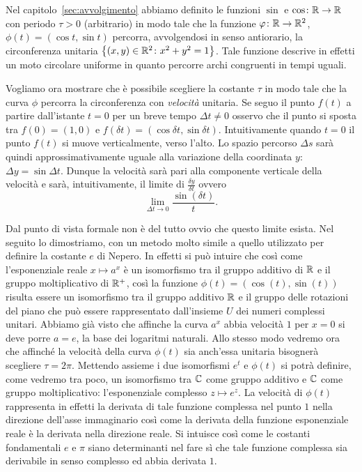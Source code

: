 Nel capitolo~\ref{sec:avvolgimento} abbiamo definito le 
funzioni $\sin$ e $\cos\colon {\mathbb R}\to {\mathbb R}$ con periodo $\tau>0$ (arbitrario)
in modo tale che la funzione $\varphi\colon {\mathbb R}\to{\mathbb R}^2$, $\phi(t)=(\cos t, \sin t)$ 
percorra, avvolgendosi in senso antiorario, la circonferenza 
unitaria ${\left\{ (x,y)\in {\mathbb R}^2\colon x^2+y^2=1 \right\}}$.
Tale funzione descrive in effetti un moto circolare uniforme 
in quanto percorre archi congruenti in tempi uguali.

Vogliamo ora mostrare che è possibile scegliere la costante $\tau$
in modo tale che la curva $\phi$ percorra la circonferenza 
con \emph{velocità} unitaria.
Se seguo il punto $f(t)$ a partire dall'istante $t=0$ per un breve tempo $\Delta t\neq 0$
osservo che il punto si sposta tra $f(0) = (1,0)$ e 
$f(\delta t) = (\cos \delta t, \sin \delta t)$.
Intuitivamente quando $t=0$ il punto $f(t)$ si muove verticalmente, 
verso l'alto. 
Lo spazio percorso $\Delta s$ sarà quindi approssimativamente 
uguale alla variazione della coordinata $y$: 
$\Delta y = \sin \Delta t$.
Dunque la velocità sarà pari alla componente verticale della velocità 
e sarà, intuitivamente, il limite di $\frac{\delta y}{\delta t}$ ovvero 
\[
\lim_{\Delta t\to 0} \frac{\sin(\delta t)}{t}.  
\]

Dal punto di vista formale non è del tutto ovvio che questo limite esista.
Nel seguito lo dimostriamo, con un metodo molto simile a quello utilizzato 
per definire la costante $e$ di Nepero.
In effetti si può intuire che così come l'esponenziale reale $x\mapsto a^x$ 
è un isomorfismo tra il gruppo additivo di ${\mathbb R}$ e il gruppo moltiplicativo 
di ${\mathbb R}^+$, così la funzione $\phi(t) = (\cos(t), \sin(t))$ 
risulta essere un isomorfismo 
tra il gruppo additivo ${\mathbb R}$ e il gruppo delle rotazioni del piano che può essere 
rappresentato dall'insieme $U$ dei numeri complessi unitari.
Abbiamo già visto che affinche la curva $a^x$ abbia velocità $1$ per $x=0$ 
si deve porre $a=e$, la base dei logaritmi naturali.
Allo stesso modo vedremo ora che affinché la velocità della curva $\phi(t)$ 
sia anch'essa unitaria bisognerà scegliere $\tau = 2\pi$.
Mettendo assieme i due isomorfismi $e^t$ e $\phi(t)$ si potrà definire,
come vedremo tra poco, un isomorfismo tra ${\mathbb C}$ come gruppo additivo e 
${\mathbb C}$ come gruppo moltiplicativo: l'esponenziale complesso $z\mapsto e^z$. 
La velocità di $\phi(t)$ rappresenta in effetti la derivata di tale funzione 
complessa nel punto $1$ nella direzione dell'asse immaginario 
così come la derivata della funzione esponenziale reale è la derivata 
nella direzione reale. 
Si intuisce così come le costanti fondamentali $e$ e $\pi$ siano determinanti 
nel fare sì che tale funzione complessa sia derivabile in senso complesso 
ed abbia derivata $1$.

